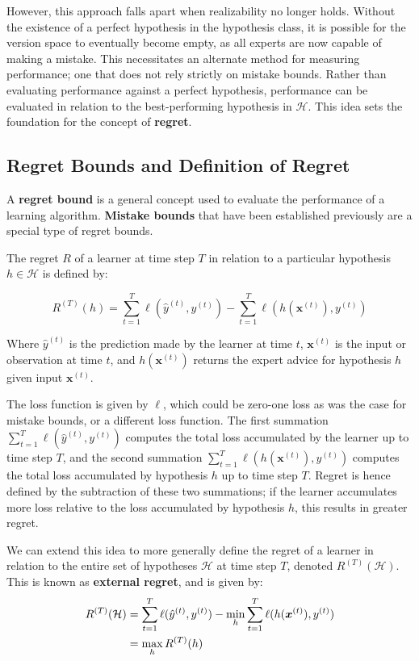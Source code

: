 \documentclass[11pt]{article}
\begin{document}
However, this approach falls apart when realizability no longer holds. Without the existence of a perfect hypothesis in the hypothesis class, it is possible for the version space to eventually become empty, as all experts are now capable of making a mistake. This necessitates an alternate method for measuring performance; one that does not rely strictly on mistake bounds. Rather than evaluating performance against a perfect hypothesis, performance can be evaluated in relation to the best-performing hypothesis in $\mathcal{H}$. This idea sets the foundation for the concept of \textbf{regret}.

\subsection{Regret Bounds and Definition of Regret}

A \textbf{regret bound} is a general concept used to evaluate the performance of a learning algorithm. \textbf{Mistake bounds} that have been established previously are a special type of regret bounds.

The regret $R$ of a learner at time step $T$ in relation to a particular hypothesis $h\in\mathcal{H}$ is defined by:

$$ R^{(T)}(h) = \sum_{t=1}^T{\ell(\hat{y}^{(t)},y^{(t)})} - \sum_{t=1}^T{\ell(h(\boldsymbol{x}^{(t)}),y^{(t)})} $$
 
Where $\hat{y}^{(t)}$ is the prediction made by the learner at time $t$, $\boldsymbol{x}^{(t)}$ is the input or observation at time $t$, and $h(\boldsymbol{x}^{(t)})$ returns the expert advice for hypothesis $h$ given input $\boldsymbol{x}^{(t)}$. 

The loss function is given by $\ell$, which could be zero-one loss as was the case for mistake bounds, or a different loss function. The first summation $\sum_{t=1}^T{\ell(\hat{y}^{(t)},y^{(t)})}$ computes the total loss accumulated by the learner up to time step $T$, and the second summation $\sum_{t=1}^T{\ell(h(\boldsymbol{x}^{(t)}),y^{(t)})}$ computes the total loss accumulated by hypothesis $h$ up to time step $T$. Regret is hence defined by the subtraction of these two summations; if the learner accumulates more loss relative to the loss accumulated by hypothesis $h$, this results in greater regret.

We can extend this idea to more generally define the regret of a learner in relation to the entire set of hypotheses $\mathcal{H}$ at time step $T$, denoted $R^{(T)}(\mathcal{H})$. This is known as \textbf{external regret}, and is given by:
\begin{align}\notag
R^{(T)}(\mathcal{H}) &= \sum_{t=1}^T{\ell(\hat{y}^{(t)},y^{(t)})} - 
\min_h\sum_{t=1}^T{\ell(h(\boldsymbol{x}^{(t)}),y^{(t)})} \\ \notag
&= \max_hR^{(T)}(h)
\end{align}
\end{document}
